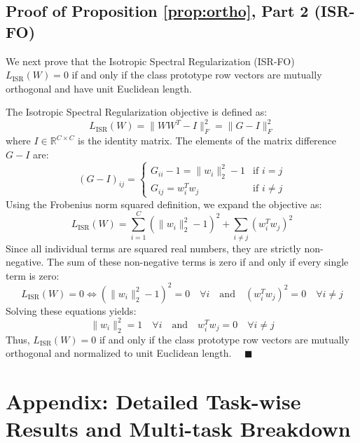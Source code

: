 \documentclass{article}
\theoremstyle{plain}
\theoremstyle{definition}
\theoremstyle{remark}
\begin{document}
\subsection{Proof of Proposition \ref{prop:ortho}, Part 2 (ISR-FO)}
We next prove that the Isotropic Spectral Regularization (ISR-FO) $L_{\text{ISR}}(W) = 0$ if and only if the class prototype row vectors are mutually orthogonal and have unit Euclidean length.

The Isotropic Spectral Regularization objective is defined as:
\begin{equation}
  L_{\text{ISR}}(W) = \|W W^T - I\|_F^2 = \|G - I\|_F^2
\end{equation}
where $I \in \mathbb{R}^{C \times C}$ is the identity matrix. The elements of the matrix difference $G - I$ are:
\begin{equation}
  (G - I)_{ij} = \begin{cases} G_{ii} - 1 = \|w_i\|_2^2 - 1 & \text{if } i = j \\ G_{ij} = w_i^T w_j & \text{if } i \neq j \end{cases}
\end{equation}
Using the Frobenius norm squared definition, we expand the objective as:
\begin{equation}
  L_{\text{ISR}}(W) = \sum_{i=1}^C (\|w_i\|_2^2 - 1)^2 + \sum_{i \neq j} (w_i^T w_j)^2
\end{equation}
Since all individual terms are squared real numbers, they are strictly non-negative. The sum of these non-negative terms is zero if and only if every single term is zero:
\begin{equation}
  L_{\text{ISR}}(W) = 0 \iff (\|w_i\|_2^2 - 1)^2 = 0 \quad \forall i \quad \text{and} \quad (w_i^T w_j)^2 = 0 \quad \forall i \neq j
\end{equation}
Solving these equations yields:
\begin{equation}
  \|w_i\|_2^2 = 1 \quad \forall i \quad \text{and} \quad w_i^T w_j = 0 \quad \forall i \neq j
\end{equation}
Thus, $L_{\text{ISR}}(W) = 0$ if and only if the class prototype row vectors are mutually orthogonal and normalized to unit Euclidean length. $\quad \blacksquare$

\section{Appendix: Detailed Task-wise Results and Multi-task Breakdown}
\label{appendix:detailed_results}
\end{document}
